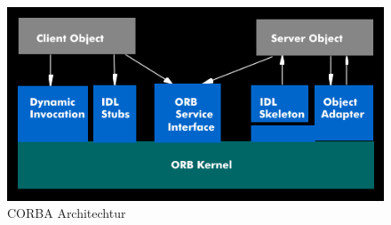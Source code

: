     \begin{figure}[h]
        \centering
        \includegraphics[scale= 0.77]{archiCorba/CORBA-Architektur.png}
        \caption{CORBA Architechtur}
    \end{figure}

        


    
    